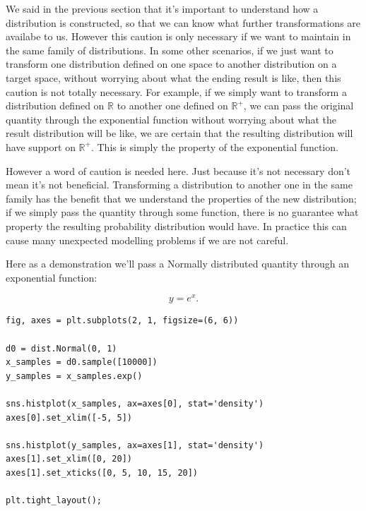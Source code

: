 \documentclass[11pt]{article}
\begin{document}
We said in the previous section that it's important to understand how a distribution is constructed, so that we can know what further transformations are availabe to us. However this caution is only necessary if we want to maintain in the same family of distributions. In some other scenarios, if we just want to transform one distribution defined on one space to another distribution on a target space, without worrying about what the ending result is like, then this caution is not totally necessary. For example, if we simply want to transform a distribution defined on \(\mathbb{R}\) to another one defined on \(\mathbb{R}^+\), we can pass the original quantity through the exponential function without worrying about what the result distribution will be like, we are certain that the resulting distribution will have support on \(\mathbb{R}^+\). This is simply the property of the exponential function.

However a word of caution is needed here. Just because it's not necessary don't mean it's not beneficial. Transforming a distribution to another one in the same family has the benefit that we understand the properties of the new distribution; if we simply pass the quantity through some function, there is no guarantee what property the resulting probability distribution would have. In practice this can cause many unexpected modelling problems if we are not careful.

Here as a demonstration we'll pass a Normally distributed quantity through an exponential function:

$$ y = e^x.$$

\begin{verbatim}
fig, axes = plt.subplots(2, 1, figsize=(6, 6))

d0 = dist.Normal(0, 1)
x_samples = d0.sample([10000])
y_samples = x_samples.exp()

sns.histplot(x_samples, ax=axes[0], stat='density')
axes[0].set_xlim([-5, 5])

sns.histplot(y_samples, ax=axes[1], stat='density')
axes[1].set_xlim([0, 20])
axes[1].set_xticks([0, 5, 10, 15, 20])

plt.tight_layout();
\end{verbatim}
\end{document}
